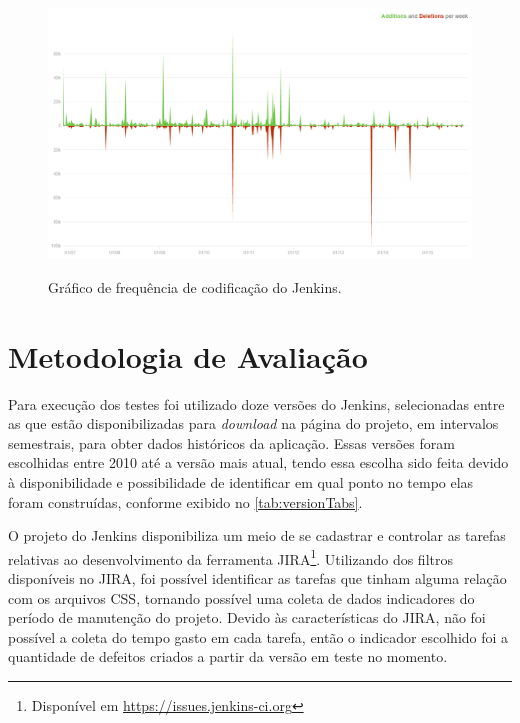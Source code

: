 \begin{figure}[!htb]
	\centering
	\caption{Gráfico de frequência de codificação do Jenkins.}
	\includegraphics[width=1\textwidth]{./04-figuras/code_freq_graph}
	\label{fig:codeFreqGraph}
\end{figure}

\section{Metodologia de Avaliação}

Para execução dos testes foi utilizado doze versões do Jenkins, selecionadas entre as que estão disponibilizadas para \textit{download} na página do projeto, em intervalos semestrais, para obter dados históricos da aplicação. Essas versões foram escolhidas entre 2010 até a versão mais atual, tendo essa escolha sido feita devido à disponibilidade e possibilidade de identificar em qual ponto no tempo elas foram construídas, conforme exibido no \autoref{tab:versionTabs}.




O projeto do Jenkins disponibiliza um meio de se cadastrar e controlar as tarefas relativas ao desenvolvimento da ferramenta JIRA\footnote{Disponível em \url{https://issues.jenkins-ci.org}}. Utilizando dos filtros disponíveis no JIRA, foi possível identificar as tarefas que tinham alguma relação com os arquivos CSS, tornando possível uma coleta de dados indicadores do período de manutenção do projeto. Devido às características do JIRA, não foi possível a coleta do tempo gasto em cada tarefa, então o indicador escolhido foi a quantidade de defeitos criados a partir da versão em teste no momento.

